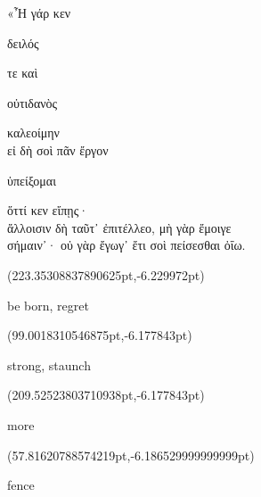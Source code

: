 \documentclass{ransom}
\begin{document}
\begin{foreignpage}
\begin{graytext}
«Ἦ γάρ κεν \begin{whitetext}δειλός\end{whitetext} τε καὶ \begin{whitetext}οὐτιδανὸς\end{whitetext} καλεοίμην\\
εἰ δὴ σοὶ πᾶν ἔργον \begin{whitetext}ὑπείξομαι\end{whitetext} ὅττί κεν εἴπῃς·\\
ἄλλοισιν δὴ ταῦτ᾽ ἐπιτέλλεο, μὴ γὰρ ἔμοιγε\hfill{}\\
σήμαιν᾽· οὐ γὰρ ἔγωγ᾽ ἔτι σοὶ πείσεσθαι ὀΐω.\\

\end{graytext}

{\linespread{1.0}\footnotesize \begin{textblock*}{37.94588pt}(223.35308837890625pt,\pdfpageheight-557.3775939941406pt-6.229972pt)\parbox[b]{37.94588pt}{\begin{blacktext}\begin{latin}be born, regret\end{latin}\end{blacktext}}\end{textblock*}
\begin{textblock*}{46.64723pt}(99.0018310546875pt,\pdfpageheight-557.3775939941406pt-6.177843pt)\parbox[b]{46.64723pt}{\begin{blacktext}\begin{latin}strong, staunch\end{latin}\end{blacktext}}\end{textblock*}
\begin{textblock*}{55.98164pt}(209.52523803710938pt,\pdfpageheight-530.3775939941406pt-6.177843pt)\parbox[b]{55.98164pt}{\begin{blacktext}\begin{latin}more\end{latin}\end{blacktext}}\end{textblock*}
\begin{textblock*}{28.63629pt}(57.81620788574219pt,\pdfpageheight-449.3775939941406pt-6.186529999999999pt)\parbox[b]{28.63629pt}{\begin{blacktext}\begin{latin}fence\end{latin}\end{blacktext}}\end{textblock*}
}
\end{foreignpage}
\end{document}
